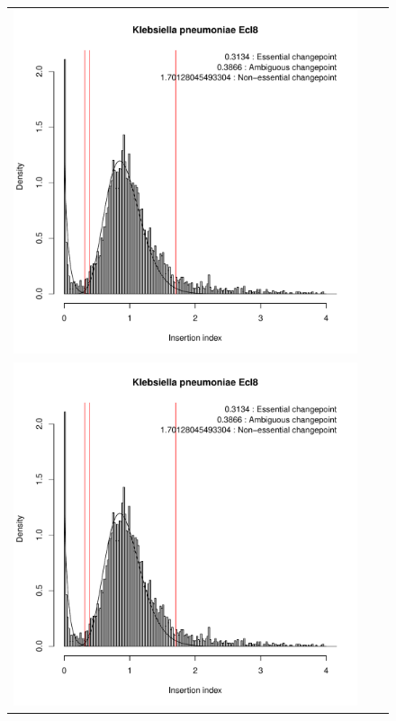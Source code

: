 \documentclass[12pt,letterpaper]{article}
\begin{document}
\begin{figure}
\begin{tabular}{c c c}
\includegraphics[page=9, scale=0.25]{essentiality-normalised.pdf}\\
\includegraphics[page=10, scale=0.25]{essentiality-normalised.pdf}&

\end{tabular}
\end{figure}
\end{document}
